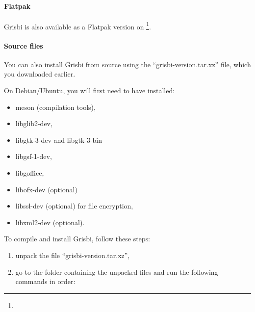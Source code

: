 \paragraph{Flatpak}\mbox{}		%

Grisbi is also available as a Flatpak version on \footnote{\urlFlatpakGrisbi}.

\paragraph{Source files}\mbox{}		%

You can also install Grisbi from source using the \enquote{grisbi-version.tar.xz} file, which you downloaded earlier.

On Debian/Ubuntu, you will first need to have installed:
\begin{itemize}
	\item meson (compilation tools),
	\item libglib2-dev,
	\item libgtk-3-dev and libgtk-3-bin
	\item libgsf-1-dev,
	\item libgoffice,
	\item libofx-dev (optional)%
	\item libssl-dev (optional) for file encryption,%
	\item libxml2-dev (optional).
\end{itemize}

To compile and install Grisbi, follow these steps:

\begin{enumerate}
	\item unpack the file \enquote{grisbi-version.tar.xz},
	\item go to the folder containing the unpacked files and run the following commands in order:
\end{enumerate}

